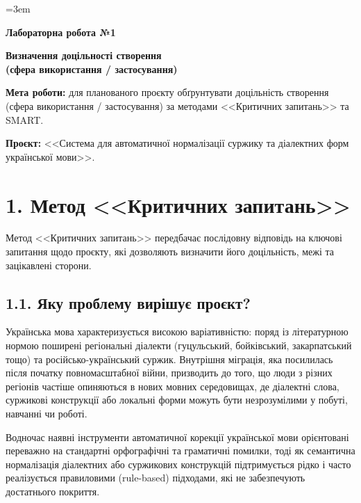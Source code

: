 \documentclass[14pt]{extarticle}
\begin{document}
\sloppy
\emergencystretch=3em

\begin{center}
\textbf{Лабораторна робота №1}

\medskip

\textbf{Визначення доцільності створення\\(сфера використання / застосування)}
\end{center}

\medskip

\textbf{Мета роботи:} для планованого проєкту обґрунтувати доцільність створення (сфера використання / застосування) за методами <<Критичних запитань>> та SMART.

\textbf{Проєкт:} <<Система для автоматичної нормалізації суржику та діалектних форм української мови>>.

\section*{1. Метод <<Критичних запитань>>}

Метод <<Критичних запитань>> передбачає послідовну відповідь на ключові запитання щодо проєкту, які дозволяють визначити його доцільність, межі та зацікавлені сторони.

\subsection*{1.1. Яку проблему вирішує проєкт?}

Українська мова характеризується високою варіативністю: поряд із літературною нормою поширені регіональні діалекти (гуцульський, бойківський, закарпатський тощо) та російсько-український суржик. Внутрішня міграція, яка посилилась після початку повномасштабної війни, призводить до того, що люди з різних регіонів частіше опиняються в нових мовних середовищах, де діалектні слова, суржикові конструкції або локальні форми можуть бути незрозумілими у побуті, навчанні чи роботі.

Водночас наявні інструменти автоматичної корекції української мови орієнтовані переважно на стандартні орфографічні та граматичні помилки, тоді як семантична нормалізація діалектних або суржикових конструкцій підтримується рідко і часто реалізується правиловими (rule-based) підходами, які не забезпечують достатнього покриття.
\end{document}
